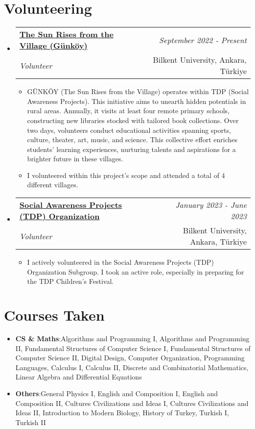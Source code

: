 \documentclass[a4paper,11pt]{article}
\makeatletter
\newcommand{\resumeItem}[2]{
    \item{\textbf{#1}{:\hspace{0.5mm}#2 \vspace{-0.5mm}}}
}
\newcommand{\resumeSubheading}[4]{
\vspace{0.5mm}\item
    \begin{tabular*}{0.98\textwidth}[t]{l@{\extracolsep{\fill}}r}
    \textbf{#1} & \textit{\footnotesize{#4}} \\
    \textit{\footnotesize{#3}} &  \footnotesize{#2} \\
    \end{tabular*}\vspace{-2.4mm}
}
\newcommand{\resumeSubItem}[2]{\resumeItem{#1}{#2}\vspace{-4pt}}
\newcommand{\resumeSubHeadingListStart}{\begin{itemize}[leftmargin=*,labelsep=0mm]}
\newcommand{\resumeHeadingSkillStart}{\begin{itemize}[leftmargin=*,itemsep=1.7mm, rightmargin=2ex]}
\newcommand{\resumeItemListStart}{\begin{justify}\begin{itemize}[leftmargin=3ex, rightmargin=2ex, noitemsep,labelsep=1.2mm,itemsep=0mm]\small}
\newcommand{\resumeSubHeadingListEnd}{\end{itemize}\vspace{2mm}}
\newcommand{\resumeHeadingSkillEnd}{\end{itemize}\vspace{-2mm}}
\newcommand{\resumeItemListEnd}{\end{itemize}\end{justify}\vspace{-2mm}}
\makeatother
\begin{document}
\section{\textbf{Volunteering}}
    \resumeSubHeadingListStart
        \resumeSubheading
            {\href{https://w3.bilkent.edu.tr/www/ogrenci-dekanligi/toplumsal-duyarlilik-projeleri/}{The Sun Rises from the Village (Günköy)}}{Bilkent University, Ankara, Türkiye}
            {Volunteer}{September 2022 - Present}
                \resumeItemListStart
                    \item GÜNKÖY (The Sun Rises from the Village) operates within TDP (Social Awareness Projects). This initiative aims to unearth hidden potentials in rural areas. Annually, it visits at least four remote primary schools, constructing new libraries stocked with tailored book collections. Over two days, volunteers conduct educational activities spanning sports, culture, theater, art, music, and science. This collective effort enriches students' learning experiences, nurturing talents and aspirations for a brighter future in these villages.
                    \item {I volunteered within this project's scope and attended a total of 4 different villages.}
                \resumeItemListEnd
        \resumeSubheading
            {\href{https://w3.bilkent.edu.tr/www/ogrenci-dekanligi/toplumsal-duyarlilik-projeleri/}{Social Awareness Projects (TDP) Organization}}{Bilkent University, Ankara, Türkiye}
            {Volunteer}{January 2023 - June 2023}
                \resumeItemListStart
                    \item I actively volunteered in the Social Awareness Projects (TDP) Organization Subgroup. I took an active role, especially in preparing for the TDP Children’s Festival.
                \resumeItemListEnd
    \resumeSubHeadingListEnd
\vspace{-6.5mm}


\section{\textbf{Courses Taken}}
\resumeHeadingSkillStart
    \resumeSubItem{CS \& Maths}
        {Algorithms and Programming I, Algorithms and Programming II, Fundamental Structures of Computer Science I, Fundamental Structures of Computer Science II, Digital Design, Computer Organization, Programming Languages, Calculus I, Calculus II, Discrete and Combinatorial Mathematics, Linear Algebra and Differential Equations}
    \resumeSubItem{Others}
        {General Physics I, English and Composition I, English and Composition II, Cultures Civilizations and Ideas I, Cultures Civilizations and Ideas II, Introduction to Modern Biology, History of Turkey, Turkish I, Turkish II}
\resumeHeadingSkillEnd
\vspace{-1mm}
\end{document}
